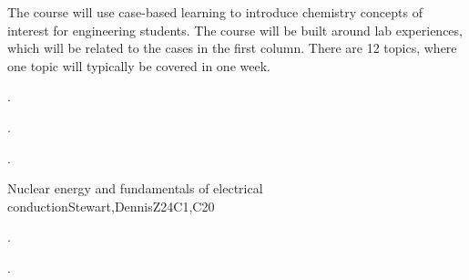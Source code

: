 \begin{syllabus}


\begin{justification}

The course will use case-based learning to introduce chemistry concepts of interest for engineering students. 
The course will be built around lab experiences, which will be related to the cases in the first column. 
There are 12 topics, where one topic will typically be covered in one week.

\end{justification}

\begin{goals}
  \item . %
  \item . %
  \item . %
\end{goals}

\begin{outcomes} 
    \item {}  
    \item {}
\end{outcomes}

\begin{competences}  
    \item {}
    \item {}
\end{competences}

\begin{unit}{}{Nuclear energy and fundamentals of electrical conduction}{Stewart,DennisZ}{24}{C1,C20}
   \begin{topics}      
    \item . %
    \item . %
      \end{topics}


\end{unit}
\end{syllabus}
